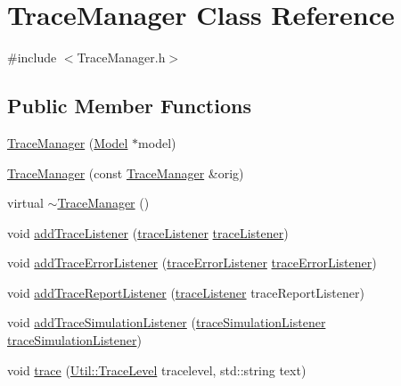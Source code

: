 \hypertarget{class_trace_manager}{\section{Trace\-Manager Class Reference}
\label{class_trace_manager}
}


{\ttfamily \#include $<$Trace\-Manager.\-h$>$}

\subsection*{Public Member Functions}
\begin{DoxyCompactItemize}
\item 
\hyperlink{class_trace_manager_ae3cb94c21a56691462d818ae8acd30cf}{Trace\-Manager} (\hyperlink{class_model}{Model} $\ast$model)
\item 
\hyperlink{class_trace_manager_af3564e61b170274e281ff6265c36e31a}{Trace\-Manager} (const \hyperlink{class_trace_manager}{Trace\-Manager} \&orig)
\item 
virtual \hyperlink{class_trace_manager_a0f0988540948118357e571343d8fc48f}{$\sim$\-Trace\-Manager} ()
\item 
void \hyperlink{class_trace_manager_a73ff0914b70780d4a7ef6336a7cf75d8}{add\-Trace\-Listener} (\hyperlink{_trace_manager_8h_a5ce1a9a31f5f0fa77de45c6e6622c435}{trace\-Listener} \hyperlink{_trace_manager_8h_a5ce1a9a31f5f0fa77de45c6e6622c435}{trace\-Listener})
\item 
void \hyperlink{class_trace_manager_a55c6d2c1ba87272b81a6384e3b39ddba}{add\-Trace\-Error\-Listener} (\hyperlink{_trace_manager_8h_afad9be20bdf6a8241ae57bc2fcb678c7}{trace\-Error\-Listener} \hyperlink{_trace_manager_8h_afad9be20bdf6a8241ae57bc2fcb678c7}{trace\-Error\-Listener})
\item 
void \hyperlink{class_trace_manager_a5479d4665fdf4f11d54c718d4ce84ffe}{add\-Trace\-Report\-Listener} (\hyperlink{_trace_manager_8h_a5ce1a9a31f5f0fa77de45c6e6622c435}{trace\-Listener} trace\-Report\-Listener)
\item 
void \hyperlink{class_trace_manager_a75f2f2e8aaf4f69767a51c0b5d261233}{add\-Trace\-Simulation\-Listener} (\hyperlink{_trace_manager_8h_a615775a0e20f41866ee44014f198fa59}{trace\-Simulation\-Listener} \hyperlink{_trace_manager_8h_a615775a0e20f41866ee44014f198fa59}{trace\-Simulation\-Listener})
\item 
void \hyperlink{class_trace_manager_a242d77829b85a436fd2aab2092bfa50c}{trace} (\hyperlink{class_util_a0a3482cfa2d915e261c0cf528fdc7afc}{Util\-::\-Trace\-Level} tracelevel, std\-::string text)

\end{DoxyCompactItemize}
